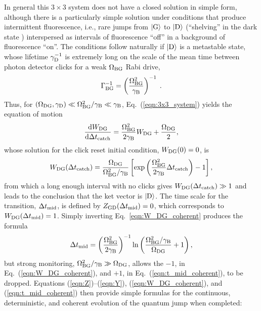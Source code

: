\documentclass[
						superscriptaddress, 																 amsmath, amssymb,
		 aps,  prb,  
										floatfix,
		linenumbers,
			]{revtex4-1}
\begin{document}
In general this $3\times3$ system does not have a closed solution in simple form, although there is a particularly simple solution under conditions  that produce intermittent fluorescence, i.e., rare jumps from $|{\rm G}\rangle$ to $|{\rm D}\rangle$ (``shelving'' in the dark state \cite{Nagourney1986}) interspersed as intervals of fluorescence ``off'' in a background of fluorescence ``on''. The conditions follow naturally if $|{\rm D}\rangle$ is a metastable state,\cite{Nagourney1986,Sauter1986,Bergquist1986,Macieszczak2016} whose lifetime $\gamma_{\rm D}^{-1}$ is extremely long on the scale of the mean time  between photon detector clicks for a weak $\Omega_{\rm BG}$ Rabi drive,
\begin{equation}
\Gamma_\mathrm{BG}^{-1} = \left(\frac{\Omega_{\rm BG}^2}{\gamma_{\rm B}}\right)^{-1}\;. 
\label{eq:GammaBG}
\end{equation}
Thus, for $(\Omega_{\rm DG},\gamma_{\rm D})\ll\Omega_{\rm BG}^2/\gamma_{\rm B}\ll\gamma_{\rm B}$, Eq.~(\ref{eqn:3x3_system}) yields the equation of motion
\begin{equation}
\frac{\mathrm{d}W_{\rm DG}}{\mathrm{d}\Delta t_{\rm catch}}=\frac{\Omega_{\rm BG}^2}{2\gamma_{\rm B}}W_{\rm DG}+\frac{\Omega_{\rm DG}}2,
\label{eqn:W_DG_equation_coherent}
\end{equation}
whose solution for the click reset initial condition, $W_{\rm DG}(0)=0$, is
\begin{equation}
W_{\rm DG}(\Delta t_{\rm catch})=\frac{\Omega_{\rm DG}}{\Omega^2_{\rm BG}/\gamma_{\rm B}}\left[\exp\left(\frac{\Omega^2_{\rm BG}}{2\gamma_{\rm B}}\Delta t_{\rm catch}\right)-1\right],
\label{eqn:W_DG_coherent}
\end{equation}
from which a long enough interval with no clicks gives $W_{\rm DG}(\Delta t_{\rm catch})\gg1$ and leads to the conclusion that the ket vector is $|{\rm D}\rangle$.
The time scale for the transition, $\Delta t_{\rm mid}$, is defined by $Z_\mathrm{GD}(\Delta t_{\rm mid})=0$, which corresponds to $W_{\rm DG}(\Delta t_{\rm mid})=1$.\cite{Porrati1987} 
Simply inverting Eq.~\eqref{eqn:W_DG_coherent} produces the formula
\begin{equation}
\Delta t_{\rm mid}=\left(\frac{\Omega^2_{\rm BG}}{2\gamma_{\rm B}}\right)^{-1}\ln\left(\frac{\Omega^2_{\rm BG}/\gamma_{\rm B}}{\Omega_{\rm DG}}+1\right),
\label{eqn:t_mid_coherent}
\end{equation}
but strong monitoring, $\Omega^2_{\rm BG}/\gamma_{\rm B}\gg\Omega_{\rm DG}$, allows the $-1$, in Eq.~(\ref{eqn:W_DG_coherent}), and $+1$, in Eq.~(\ref{eqn:t_mid_coherent}), to be dropped. Equations (\ref{eqn:Z})--(\ref{eqn:Y}), (\ref{eqn:W_DG_coherent}), and (\ref{eqn:t_mid_coherent}) then provide simple formulas for the continuous, deterministic, and coherent evolution of the quantum jump when completed:
\end{document}
